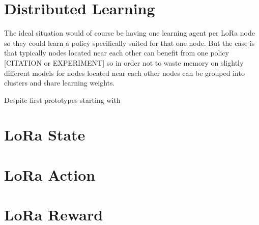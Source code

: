 \section{Distributed Learning}

The ideal situation would of course be having one learning agent 
per LoRa node so they could learn a policy specifically suited for
that one node. But the case is that typically nodes located 
near each other can benefit from one policy [CITATION or EXPERIMENT]
so in order not to waste memory on slightly different models 
for nodes located near each other nodes can be grouped into clusters
and share learning weights.



Despite first prototypes starting with 

\section{LoRa State}
\section{LoRa Action}
\section{LoRa Reward}

